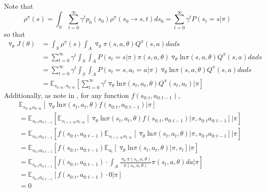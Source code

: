 \documentclass[11pt]{article}
\theoremstyle{definition}
\begin{document}
Note that 
\begin{equation}
\rho^{\pi}(s) = \int_S \sum_{t=0}^{\infty} \gamma^t p_0(s_0) \rho^{\pi}(s_0 \rightarrow s, t) ds_0
= \sum_{t=0}^{\infty} \gamma^t P \left( s_t = s | \pi \right)
\end{equation}
so that
\begin{equation}
\begin{split}
\triangledown_{\theta} J ( \theta ) 
&= \int_S \rho^{\pi}(s) \int_A \triangledown_{\theta} \pi(s,a,\theta) Q^{\pi}(s,a)dads
\\
&= \sum_{t=0}^{\infty} \gamma^t \int_S \int_A P \left( s_t = s | \pi \right) \pi(s,a,\theta) \triangledown_{\theta} \mathrm{ln}\pi(s,a,\theta) Q^{\pi} (s,a)dads
\\
&= \sum_{t=0}^{\infty} \gamma^t \int_S \int_A P \left( s_t = s, a_t = a | \pi \right) \triangledown_{\theta} \mathrm{ln}\pi(s,a,\theta) Q^{\pi} (s,a)dads \\
&= \mathbb{E}_{s_{0:\infty},a_{0:\infty}} \left[ \sum_{t=0}^{\infty} \gamma^t \triangledown_{\theta} \mathrm{ln}\pi(s_t,a_t,\theta) Q^{\pi} (s_t,a_t) | \pi \right]
\end{split}
\end{equation}
Additionally, as note in \cite{schulman2015}, for any function $f(s_{0:t},a_{0:t-1})$, 
\begin{equation}
\begin{aligned}
& \mathbb{E}_{s_{0:\infty}a_{0:\infty}} \left[ \triangledown_{\theta} \mathrm{ln} \pi (s_t,a_t,\theta) f(s_{0:t},a_{0:t-1}) | \pi \right] \\
&= \mathbb{E}_{s_{0:t}a_{0:t-1}} \left[
\mathbb{E}_{s_{t+1:\infty}a_{t:\infty}} \left[
\triangledown_{\theta} \mathrm{ln}\pi(s_t,a_t,\theta) f(s_{0:t},a_{0:t-1}) | \pi, s_{0:t}a_{0:t-1}
\right] | \pi
\right]
\\
&= \mathbb{E}_{s_{0:t}a_{0:t-1}} \left[ f(s_{0:t},a_{0:t-1})
\mathbb{E}_{s_{t+1:\infty}a_{t:\infty}}  \left[
\triangledown_{\theta} \mathrm{ln}\pi(s_t,a_t,\theta) | \pi, s_{0:t}a_{0:t-1}
\right] | \pi
\right]
\\
&= \mathbb{E}_{s_{0:t}a_{0:t-1}} \left[ f(s_{0:t},a_{0:t-1})
\mathbb{E}_{a_t}  \left[
\triangledown_{\theta} \mathrm{ln}\pi(s_t,a_t,\theta) | \pi, s_t
\right] | \pi
\right]
\\
&= \mathbb{E}_{s_{0:t}a_{0:t-1}} \left[ f(s_{0:t},a_{0:t-1})
\cdot \int_A \frac{\triangledown_{\theta} \pi (s_t,a,\theta)}{\pi (s_t,a,\theta)} \pi (s_t,a,\theta) da \vert \pi
\right]
\\
&= \mathbb{E}_{s_{0:t}a_{0:t-1}} \left[ f(s_{0:t},a_{0:t-1})
\cdot 0 | \pi
\right]
\\
&= 0
\end{aligned}
\end{equation}
\end{document}

